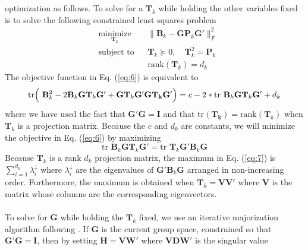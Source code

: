 \documentclass[11pt]{asaproc}
\begin{document}
optimization as follows. To solve for a $\mathbf{T}_k$ while holding
the other variables fixed is to solve the following constrained least
squares problem
\begin{equation}
  \label{eq:6}
  \begin{aligned}
	& \underset{\mathbf{T}_k}{\text{minimize}}
	& &  \| \mathbf{B}_k - \mathbf{G}
\mathbf{P}_k \mathbf{G}' \|_F^2 \\
	& \text{subject to}
	& & \mathbf{T}_k \succeq 0, \quad \mathbf{T}_k^2 = \mathbf{P}_k \\
    & & & \mathrm{rank}(\mathbf{T}_k) = d_k
  \end{aligned}
\end{equation}
The objective function in Eq. (\ref{eq:6}) is equivalent to 
\begin{equation*}
  \mathrm{tr}\Bigl(\,\, \mathbf{B}_k^2 - 2
  \mathbf{B}_k \mathbf{G} \mathbf{T}_{k} \mathbf{G}'
  + \mathbf{G} \mathbf{T}_k \mathbf{G}' \mathbf{G} \mathbf{T_k}
  \mathbf{G}'\Bigr) = c - 2 * \mathrm{tr} \,\, \mathbf{B}_k
  \mathbf{G} \mathbf{T}_{k} \mathbf{G}' + d_k
\end{equation*}
where we have used the fact that $\mathbf{G}' \mathbf{G} = \mathbf{I}$
and that $\mathrm{tr}(\mathbf{T_k}) =
\mathrm{rank}(\mathbf{T}_k)$ when $\mathbf{T}_k$ is a projection
matrix. Because the $c$ and $d_k$ are constants, we will minimize the
objective in Eq. (\ref{eq:6}) by maximizing
\begin{equation}
  \label{eq:7}
  \mathrm{tr} \,\, \mathbf{B}_k \mathbf{G}
  \mathbf{T}_{k} \mathbf{G}' = \mathrm{tr} \,\, \mathbf{T}_k \mathbf{G}'
  \mathbf{B}_k \mathbf{G}
\end{equation}
Because $\mathbf{T}_k$ is a rank $d_k$ projection matrix, the maximum in
Eq. (\ref{eq:7}) is $\sum_{i=1}^{d_k} \lambda_{i}^{\downarrow}$ where
$\lambda_{i}^{\downarrow}$ are the eigenvalues of $\mathbf{G}'
\mathbf{B}_k \mathbf{G}$ arranged in
non-increasing order. Furthermore, the maximum is
obtained when $\mathbf{T}_k = \mathbf{V}
\mathbf{V}'$ where $\mathbf{V}$ is the matrix whose columns are the
corresponding eigenvectors. \\ \\
%
\noindent
To solve for $\mathbf{G}$ while holding the $\mathbf{T}_k$ fixed, we
use an iterative majorization algorithm following
\citet{kiers90:_major}. If $\mathbf{G}$ is the
current group space, constrained so that $\mathbf{G}' \mathbf{G} =
\mathbf{I}$, then by setting $\mathbf{H} = \mathbf{V} \mathbf{W}'$
where $\mathbf{V} \mathbf{D} \mathbf{W}'$ is the singular value
\end{document}
